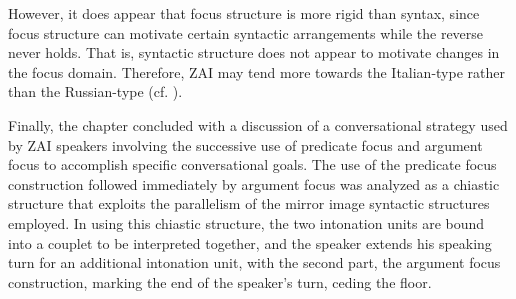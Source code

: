 However, it does appear that focus structure is more rigid than syntax, since focus structure can motivate certain syntactic arrangements while the reverse never holds. That is, syntactic structure does not appear to motivate changes in the focus domain. Therefore, ZAI may tend more towards the Italian-type rather than the Russian-type (cf. ). 

Finally, the chapter concluded with a discussion of a conversational strategy used by ZAI speakers involving the successive use of predicate focus and argument focus to accomplish specific conversational goals. The use of the predicate focus construction followed immediately by argument focus was analyzed as a chiastic structure that exploits the parallelism of the mirror image syntactic structures employed. In using this chiastic structure, the two intonation units are bound into a couplet to be interpreted together, and the speaker extends his speaking turn for an additional intonation unit, with the second part, the argument focus construction, marking the end of the speaker's turn, ceding the floor.



